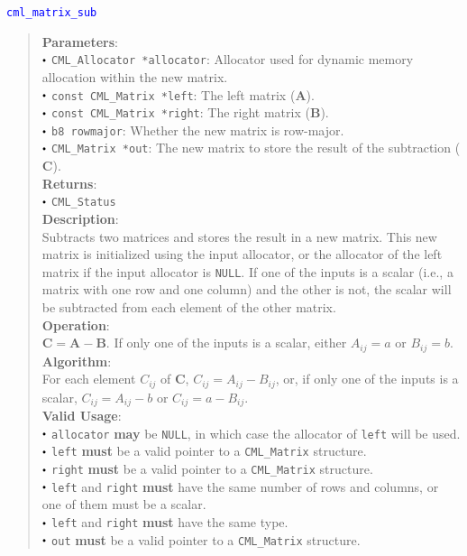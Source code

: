 \documentclass[a4paper,oneside,8pt]{extarticle}
\newcommand{\function}[1]{
  \noindent\textcolor{blue}{\texttt{#1}}
  \vspace{-0.3em}
}
\renewcommand{\dot}{\raisebox{0.3ex}{\scalebox{0.6}{$\bullet$}}}
\theoremstyle{definition}
\begin{document}
\function{cml\_matrix\_sub}
\begin{quote}
  \textbf{Parameters}: \\
  $\dot$ \texttt{CML\_Allocator *allocator}: Allocator used for dynamic memory allocation within the new matrix. \\
  $\dot$ \texttt{const CML\_Matrix *left}: The left matrix ($\mathbf{A}$). \\
  $\dot$ \texttt{const CML\_Matrix *right}: The right matrix ($\mathbf{B}$). \\
  $\dot$ \texttt{b8 rowmajor}: Whether the new matrix is row-major. \\
  $\dot$ \texttt{CML\_Matrix *out}: The new matrix to store the result of the subtraction ($\mathbf{C}$). \\
  \textbf{Returns}: \\
  $\dot$ \texttt{CML\_Status} \\

  \vspace{-0.75em}
  \textbf{Description}: \\
  Subtracts two matrices and stores the result in a new matrix. This new matrix is initialized using the input allocator, or the allocator of the left matrix if the input allocator is \texttt{NULL}. If one of the inputs is a scalar (i.e., a matrix with one row and one column) and the other is not, the scalar will be subtracted from each element of the other matrix. \\

  \vspace{-0.75em}
  \textbf{Operation}: \\
  $\mathbf{C} = \mathbf{A} - \mathbf{B}$. If only one of the inputs is a scalar, either $A_{ij} = a$ or $B_{ij} = b$. \\

  \vspace{-0.75em}
  \textbf{Algorithm}: \\
  For each element $C_{ij}$ of $\mathbf{C}$, $C_{ij} = A_{ij} - B_{ij}$, or, if only one of the inputs is a scalar, $C_{ij} = A_{ij} - b$ or $C_{ij} = a - B_{ij}$. \\

  \vspace{-0.75em}
  \textbf{Valid Usage}: \\
  $\dot$ \texttt{allocator} \textbf{may} be \texttt{NULL}, in which case the allocator of \texttt{left} will be used. \\
  $\dot$ \texttt{left} \textbf{must} be a valid pointer to a \texttt{CML\_Matrix} structure. \\
  $\dot$ \texttt{right} \textbf{must} be a valid pointer to a \texttt{CML\_Matrix} structure. \\
  $\dot$ \texttt{left} and \texttt{right} \textbf{must} have the same number of rows and columns, or one of them must be a scalar. \\
  $\dot$ \texttt{left} and \texttt{right} \textbf{must} have the same type. \\
  $\dot$ \texttt{out} \textbf{must} be a valid pointer to a \texttt{CML\_Matrix} structure. \\


\end{quote}
\end{document}
